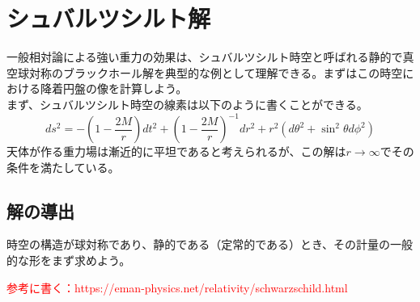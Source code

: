 \documentclass[dvipdfmx]{report} %
\begin{document}
\chapter{シュバルツシルト解}
一般相対論による強い重力の効果は、シュバルツシルト時空と呼ばれる静的で真空球対称のブラックホール解を典型的な例として理解できる。まずはこの時空における降着円盤の像を計算しよう。\\
まず、シュバルツシルト時空の線素は以下のように書くことができる。
\[
ds^2 =
		-\left( 1 - \frac{2M}{r} \right)dt^2
		+ \left( 1 - \frac{2M}{r} \right)^{-1}dr^2
		+ r^2( d\theta^2 + \sin^2\theta d\phi^2 )
\]
天体が作る重力場は漸近的に平坦であると考えられるが、この解は$r \rightarrow \infty$でその条件を満たしている。

\section{解の導出}
時空の構造が球対称であり、静的である（定常的である）とき、その計量の一般的な形をまず求めよう。

\textcolor{red}{
参考に書く：https://eman-physics.net/relativity/schwarzschild.html 
}

\end{document}
